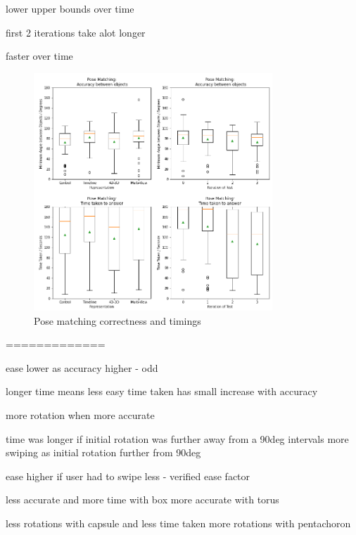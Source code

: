 \documentclass{l4proj}
\begin{document}
lower upper bounds over time

first 2 iterations take alot longer

faster over time

\begin{figure}
  \centering
  \includegraphics[width=0.8\textwidth]{images/results/pose_matching_stats.png}
  \caption{Pose matching correctness and timings}
  \label{fig:pos_stats}
\end{figure}

=============

ease lower as accuracy higher - odd

longer time means less easy
time taken has small increase with accuracy

more rotation when more accurate

time was longer if initial rotation was further away from a 90deg intervals
more swiping as initial rotation further from 90deg

ease higher if user had to swipe less - verified ease factor


less accurate and more time with box
more accurate with torus

less rotations with capsule and less time taken
more rotations with pentachoron
\end{document}
